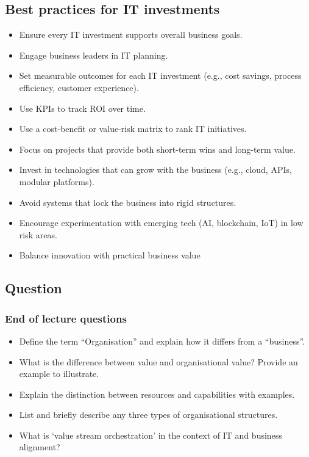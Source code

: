 \subsection{Best practices for IT investments}

\begin{itemize}
    \item Ensure every IT investment supports overall business goals.
    \item Engage business leaders in IT planning.
    \item Set measurable outcomes for each IT investment (e.g., cost savings, process efficiency, customer experience).
    \item Use KPIs to track ROI over time.
    \item Use a cost-benefit or value-risk matrix to rank IT initiatives.
    \item Focus on projects that provide both short-term wins and long-term value.
    \item Invest in technologies that can grow with the business (e.g., cloud, APIs, modular platforms).
    \item Avoid systems that lock the business into rigid structures.
    \item Encourage experimentation with emerging tech (AI, blockchain, IoT) in low risk areas.
    \item Balance innovation with practical business value
\end{itemize}

\subsection{Question}

\subsubsection{End of lecture questions}

\begin{itemize}
    \item Define the term “Organisation” and explain how it differs from a “business”.
    \item What is the difference between value and organisational value? Provide an example to illustrate.
    \item Explain the distinction between resources and capabilities with examples.
    \item List and briefly describe any three types of organisational structures.
    \item What is ‘value stream orchestration’ in the context of IT and business alignment?
\end{itemize}

